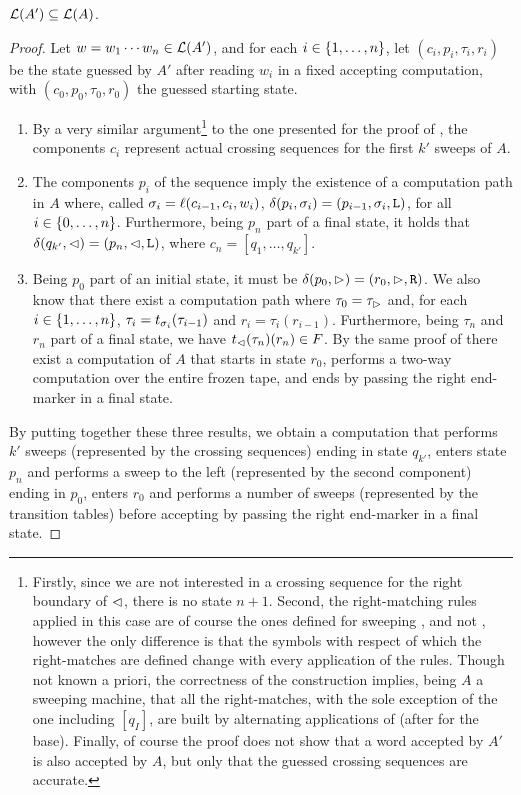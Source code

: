 \begin{lemm}\label{lem:swkLAtoNFA-2}
	$\mathcal L(A')\subseteq\mathcal L(A)$.
\end{lemm}
\begin{proof}
	Let $w=w_1\cdots w_n\in\mathcal L(A')$, and for each $i\in\{1,\dots,n\}$, let $(c_i,p_i,\tau_i,r_i)$ be the state guessed by $A'$ after reading $w_i$ in a fixed accepting computation, with $(c_0,p_0,\tau_0,r_0)$ the guessed starting state.
	\begin{enumerate}
		\item By a very similar argument\footnote{%
			      Firstly, since we are not interested in a crossing sequence for the right boundary of $\lhd$, there is no state $n+1$.
			      Second, the right-matching rules applied in this case are of course the ones defined for sweeping \kDLAs, and not \TDFAs, however the only difference is that the symbols with respect of which the right-matches are defined change with every application of the rules.
			      Though not known a priori, the correctness of the construction implies, being $A$ a sweeping machine, that all the right-matches, with the sole exception of the one including $[q_I]$, are built by alternating applications of  (after  for the base).
			      Finally, of course the proof does not show that a word accepted by $A'$ is also accepted by $A$, but only that the guessed crossing sequences are accurate.}
		      to the one presented for the proof of , the components $c_i$ represent actual crossing sequences for the first $k'$ sweeps of $A$.
		\item The components $p_i$ of the sequence imply the existence of a computation path in $A$ where, called $\sigma_i=\ell(c_{i-1},c_i,w_i)$, $\delta(p_i,\sigma_i)=(p_{i-1},\sigma_i,\mathtt L)$, for all $i\in\{0,\dots,n\}$.
		      Furthermore, being $p_n$ part of a final state, it holds that $\delta(q_{k'},\lhd)=(p_n,\lhd,\mathtt L)$, where $c_n=[q_1,\dots,q_{k'}]$.
		\item Being $p_0$ part of an initial state, it must be $\delta(p_0,\rhd)=(r_0,\rhd,\mathtt R)$.
		      We also know that there exist a computation path where $\tau_0=\tau_\rhd$ and, for each $i\in\{1,\dots,n\}$, $\tau_i=t_{\sigma_i}(\tau_{i-1})$ and $r_i=\tau_i(r_{i-1})$.
		      Furthermore, being $\tau_n$ and $r_n$ part of a final state, we have $t_\lhd(\tau_n)(r_n)\in F$.
		      By the same proof of  there exist a computation of $A$ that starts in state $r_0$, performs a two-way computation over the entire frozen tape, and ends by passing the right end-marker in a final state.
	\end{enumerate}
	By putting together these three results, we obtain a computation that performs $k'$ sweeps (represented by the crossing sequences) ending in state $q_{k'}$, enters state $p_n$ and performs a sweep to the left (represented by the second component) ending in $p_0$, enters $r_0$ and performs a number of sweeps (represented by the transition tables) before accepting by passing the right end-marker in a final state.
\end{proof}


